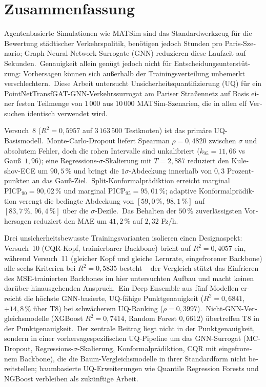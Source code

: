 \chapter*{Zusammenfassung}

\begin{otherlanguage}{ngerman}
Agentenbasierte Simulationen wie MATSim sind das Standardwerkzeug f\"ur die Bewertung st\"adtischer Verkehrspolitik, ben\"otigen jedoch Stunden pro Paris-Szenario; Graph-Neural-Network-Surrogate (GNN) reduzieren diese Laufzeit auf Sekunden.\ Genauigkeit allein gen\"ugt jedoch nicht f\"ur Entscheidungsunterst\"utzung: Vorhersagen k\"onnen sich au\ss{}erhalb der Trainingsverteilung unbemerkt verschlechtern.\ Diese Arbeit untersucht Unsicherheitsquantifizierung (UQ) f\"ur ein PointNetTransfGAT-GNN-Verkehrssurrogat am Pariser Stra\ss{}ennetz auf Basis einer festen Teilmenge von $1\,000$ aus $10\,000$ MATSim-Szenarien, die in allen elf Versuchen identisch verwendet wird.

Versuch~8 ($R^2 = 0{,}5957$ auf $3\,163\,500$ Testknoten) ist das prim\"are UQ-Basismodell.\ Monte-Carlo-Dropout liefert Spearman $\rho = 0{,}4820$ zwischen $\sigma$ und absolutem Fehler, doch die rohen Intervalle sind unkalibriert ($k_{95} = 11{,}66$ vs Gau\ss\ $1{,}96$); eine Regressions-$\sigma$-Skalierung mit $T = 2{,}887$ reduziert den Kuleshov-ECE um $90{,}5\,\%$ und bringt die $1\sigma$-Abdeckung innerhalb von $0{,}3$ Prozentpunkten an das Gau\ss-Ziel.\ Split-Konformalpr\"adiktion erreicht marginal $\mathrm{PICP}_{90} = 90{,}02\,\%$ und marginal $\mathrm{PICP}_{95} = 95{,}01\,\%$; adaptive Konformalpr\"adiktion verengt die bedingte Abdeckung von $[59{,}0\,\%,\,98{,}1\,\%]$ auf $[83{,}7\,\%,\,96{,}4\,\%]$ \"uber die $\sigma$-Dezile.\ Das Behalten der $50\,\%$ zuverl\"assigsten Vorhersagen reduziert den MAE um $41{,}2\,\%$ auf $2{,}32$ Fz/h.

Drei unsicherheitsbewusste Trainingsvarianten isolieren einen Designaspekt: Versuch~10 (CQR-Kopf, trainierbarer Backbone) bricht auf $R^2 = 0{,}4057$ ein, w\"ahrend Versuch~11 (gleicher Kopf und gleiche Lernrate, eingefrorener Backbone) alle sechs Kriterien bei $R^2 = 0{,}5835$ besteht -- der Vergleich st\"utzt das Einfrieren des MSE-trainierten Backbones im hier untersuchten Aufbau und macht keinen dar\"uber hinausgehenden Anspruch.\ Ein Deep Ensemble aus f\"unf Modellen erreicht die h\"ochste GNN-basierte, UQ-f\"ahige Punktgenauigkeit ($R^2 = 0{,}6841$, $+14{,}8\,\%$ \"uber T8) bei schw\"acherem UQ-Ranking ($\rho = 0{,}3997$).\ Nicht-GNN-Vergleichsmodelle (XGBoost $R^2 = 0{,}7414$, Random Forest $0{,}6612$) \"ubertreffen T8 in der Punktgenauigkeit.\ Der zentrale Beitrag liegt nicht in der Punktgenauigkeit, sondern in einer vorhersagespezifischen UQ-Pipeline um das GNN-Surrogat (MC-Dropout, Regressions-$\sigma$-Skalierung, Konformalpr\"adiktion, CQR mit eingefrorenem Backbone), die die Baum-Vergleichsmodelle in ihrer Standardform nicht bereitstellen; baumbasierte UQ-Erweiterungen wie Quantile Regression Forests und NGBoost verbleiben als zuk\"unftige Arbeit.
\end{otherlanguage}
